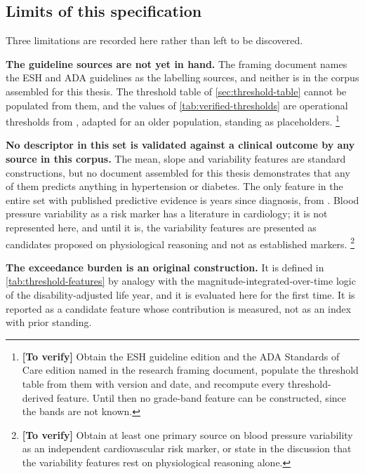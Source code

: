 \documentclass[12pt,a4paper,oneside]{report}
\newcommand{\verify}[1]{\footnote{\textbf{[To verify]} #1}}
\begin{document}
\subsection{Limits of this specification}\label{sec:feature-limits}

Three limitations are recorded here rather than left to be discovered.

\textbf{The guideline sources are not yet in hand.} The framing document names the ESH and ADA guidelines as the labelling sources, and neither is in the corpus assembled for this thesis. The threshold table of \cref{sec:threshold-table} cannot be populated from them, and the values of \cref{tab:verified-thresholds} are operational thresholds from \textcite{mihevc2025}, adapted for an older population, standing as placeholders.%
\verify{Obtain the ESH guideline edition and the ADA Standards of Care edition named in the research framing document, populate the threshold table from them with version and date, and recompute every threshold-derived feature. Until then no grade-band feature can be constructed, since the bands are not known.}

\textbf{No descriptor in this set is validated against a clinical outcome by any source in this corpus.} The mean, slope and variability features are standard constructions, but no document assembled for this thesis demonstrates that any of them predicts anything in hypertension or diabetes. The only feature in the entire set with published predictive evidence is years since diagnosis, from \textcite{mendoza2025}. Blood pressure variability as a risk marker has a literature in cardiology; it is not represented here, and until it is, the variability features are presented as candidates proposed on physiological reasoning and not as established markers.%
\verify{Obtain at least one primary source on blood pressure variability as an independent cardiovascular risk marker, or state in the discussion that the variability features rest on physiological reasoning alone.}

\textbf{The exceedance burden is an original construction.} It is defined in \cref{tab:threshold-features} by analogy with the magnitude-integrated-over-time logic of the disability-adjusted life year, and it is evaluated here for the first time. It is reported as a candidate feature whose contribution is measured, not as an index with prior standing.

\end{document}
